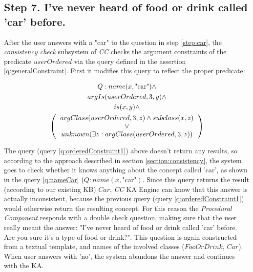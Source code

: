 \subsection{Step 7. I've never heard of food or drink called 'car' before.}
\label{section:step7}
After the user answers with a "car" to the question in step \ref{step:car}, the
\emph{consistency check} subsystem of \emph{CC} checks the argument constraints
of the predicate $userOrdered$ via the query defined in the assertion 
\ref{q:generalConstraint}. First it modifies this query to reflect the proper
predicate:

\begin{equation}\label{q:orderedConstraint1}
\begin{gathered}
   Q:name(x,\text{"car"})\land \\ 
    argIs(userOrdered,3,y)\land \\
    is(x,y)\land \\
    \left(
    \begin{tabular}{c}
        $argClass(userOrdered,3,z) \land  subclass(x,z)$\\
        $\lor$\\
        $unknown(\exists z: argClass(userOrdered,3,z))$ \\
    \end{tabular}
    \right)
\end{gathered}
\end{equation}

The query (query \ref{q:orderedConstraint1}) above doesn't return any results,
so according to the approach described in section \ref{section:consistency}, 
the system goes to check whether it knows anything about the concept called 
'car', as shown in the query \ref{q:nameCar} ($Q:name(x,\text{"car"})$.
Since this query returns the result (according to our existing KB) $Car$, 
\emph{CC} KA Engine can know that this answer is actually inconsistent, because
the previous query (query \ref{q:orderedConstraint1}) would otherwise return
the resulting concept.
For this reason the \emph{Procedural Component} responds with a double check
question, making sure that the user really meant the answer: 
"I've never heard of food or drink called 'car' before. Are you sure it's a type 
of food or drink?". This question is again constructed from a textual template,
and names of the involved classes ($FooOrDrink$, $Car$). When user answers with
'no', the system abandons the answer and continues with the KA.

